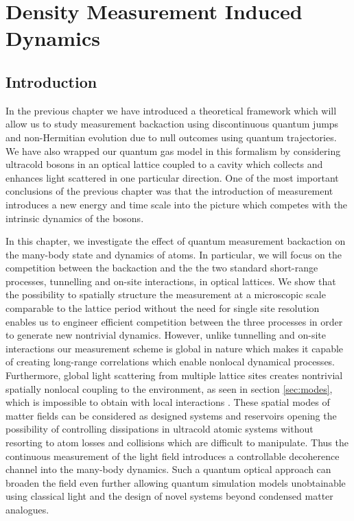 
\chapter{Density Measurement Induced Dynamics}

\ifpdf
    \graphicspath{{Chapter5/Figs/Raster/}{Chapter5/Figs/PDF/}{Chapter5/Figs/}}
\else
    \graphicspath{{Chapter5/Figs/Vector/}{Chapter5/Figs/}}
\fi


\section{Introduction}

In the previous chapter we have introduced a theoretical framework
which will allow us to study measurement backaction using
discontinuous quantum jumps and non-Hermitian evolution due to null
outcomes using quantum trajectories. We have also wrapped our quantum
gas model in this formalism by considering ultracold bosons in an
optical lattice coupled to a cavity which collects and enhances light
scattered in one particular direction. One of the most important
conclusions of the previous chapter was that the introduction of
measurement introduces a new energy and time scale into the picture
which competes with the intrinsic dynamics of the bosons.

In this chapter, we investigate the effect of quantum measurement
backaction on the many-body state and dynamics of atoms. In
particular, we will focus on the competition between the backaction
and the the two standard short-range processes, tunnelling and on-site
interactions, in optical lattices. We show that the possibility to
spatially structure the measurement at a microscopic scale comparable
to the lattice period without the need for single site resolution
enables us to engineer efficient competition between the three
processes in order to generate new nontrivial dynamics. However,
unlike tunnelling and on-site interactions our measurement scheme is
global in nature which makes it capable of creating long-range
correlations which enable nonlocal dynamical processes. Furthermore,
global light scattering from multiple lattice sites creates nontrivial
spatially nonlocal coupling to the environment, as seen in section
\ref{sec:modes}, which is impossible to obtain with local interactions
\cite{daley2014, diehl2008, syassen2008}. These spatial modes of
matter fields can be considered as designed systems and reservoirs
opening the possibility of controlling dissipations in ultracold
atomic systems without resorting to atom losses and collisions which
are difficult to manipulate. Thus the continuous measurement of the
light field introduces a controllable decoherence channel into the
many-body dynamics. Such a quantum optical approach can broaden the
field even further allowing quantum simulation models unobtainable
using classical light and the design of novel systems beyond condensed
matter analogues.

